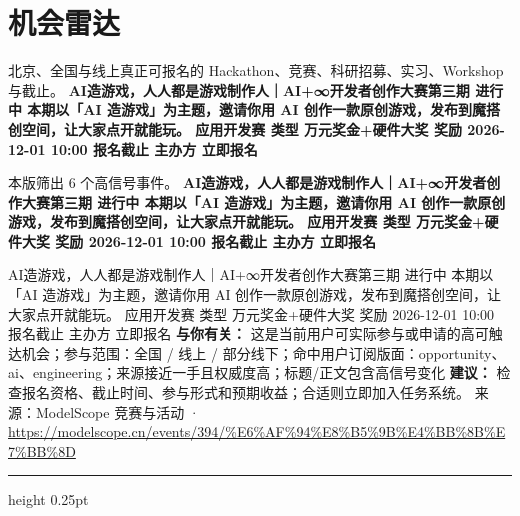 \documentclass[10.5pt]{ctexart}
\begin{document}
\section*{机会雷达}
{\color{ormuted} 北京、全国与线上真正可报名的 Hackathon、竞赛、科研招募、实习、Workshop 与截止。}
\vspace{2mm}
{\LARGE\bfseries AI造游戏，人人都是游戏制作人｜AI+∞开发者创作大赛第三期 进行中 本期以「AI 造游戏」为主题，邀请你用 AI 创作一款原创游戏，发布到魔搭创空间，让大家点开就能玩。 应用开发赛 类型 万元奖金+硬件大奖 奖励 2026-12-01 10:00 报名截止 主办方 立即报名}\par
\vspace{1mm}
{\color{ormuted} 本版筛出 6 个高信号事件。}
\vspace{3mm}
{\Large\bfseries AI造游戏，人人都是游戏制作人｜AI+∞开发者创作大赛第三期 进行中 本期以「AI 造游戏」为主题，邀请你用 AI 创作一款原创游戏，发布到魔搭创空间，让大家点开就能玩。 应用开发赛 类型 万元奖金+硬件大奖 奖励 2026-12-01 10:00 报名截止 主办方 立即报名}\par
AI造游戏，人人都是游戏制作人｜AI+∞开发者创作大赛第三期 进行中 本期以「AI 造游戏」为主题，邀请你用 AI 创作一款原创游戏，发布到魔搭创空间，让大家点开就能玩。 应用开发赛 类型 万元奖金+硬件大奖 奖励 2026-12-01 10:00 报名截止 主办方 立即报名
\textbf{与你有关：} 这是当前用户可实际参与或申请的高可触达机会；参与范围：全国 / 线上 / 部分线下；命中用户订阅版面：opportunity、ai、engineering；来源接近一手且权威度高；标题/正文包含高信号变化
\textbf{建议：} 检查报名资格、截止时间、参与形式和预期收益；合适则立即加入任务系统。
{\footnotesize\color{ormuted} 来源：ModelScope 竞赛与活动 · \url{https://modelscope.cn/events/394/%E6%AF%94%E8%B5%9B%E4%BB%8B%E7%BB%8D}}
\vspace{4mm}
\hrule height 0.25pt
\vspace{3mm}
\end{document}
